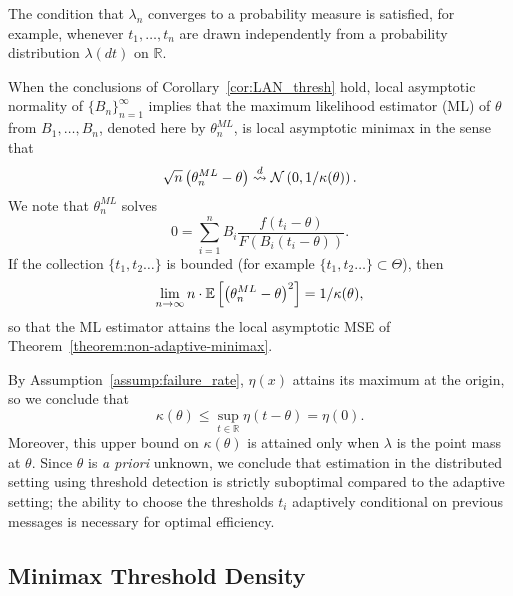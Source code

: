 The condition that $\lambda_n$ converges to a probability measure is
satisfied, for example, whenever $t_1,\ldots,t_n$ are drawn
independently from a probability distribution $\lambda(dt)$ on $\mathbb
R$.

When the conclusions of Corollary~\ref{cor:LAN_thresh} hold, local asymptotic normality of $\{B_n\}_{n=1}^\infty$ implies that the maximum
likelihood estimator (ML) of $\theta$ from $B_1,\ldots,B_n$, denoted here by
${\theta}^{ML}_n$, is local asymptotic minimax in the sense that
\begin{equation*}
  \sqrt{n} \left( {\theta}^{ML}_n - \theta \right)
  \stackrel{d}{\rightsquigarrow} \mathcal{N}\left(0, 1/\kappa(\theta) \right). 
\end{equation*}
We note that ${\theta}^{ML}_n$ solves
\begin{equation}
  \label{eq:ML}
  0 = \sum_{i=1}^n B_i \frac{f \left( t_i-\theta\right) }{F \left(B_i  (t_i-\theta)\right) }.
\end{equation}
If the collection $\{t_1,t_2\ldots\}$ is bounded
(for example $\{t_1,t_2\ldots\} \subset \Theta$), then
\begin{equation*}
\lim_{n\to \infty} n \cdot \mathbb{E}\left[ \left({\theta}^{ML}_n - \theta \right)^2\right]  = 1/\kappa(\theta), 
\end{equation*} 
so that the ML estimator attains the local asymptotic MSE of Theorem~\ref{theorem:non-adaptive-minimax}.

By Assumption~\ref{assump:failure_rate},
$\eta(x)$ attains its maximum at the origin, so we conclude that
\begin{equation*}
  \kappa(\theta) \leq \sup_{t\in \mathbb R} \eta \left( t-\theta\right) = \eta(0).
\end{equation*}
Moreover, this upper bound on $\kappa(\theta)$ is attained only when
$\lambda$ is the point mass at $\theta$. Since $\theta$ is \emph{a priori}
unknown, we conclude that estimation in the distributed setting using
threshold detection is strictly suboptimal compared to the adaptive
setting; the ability to choose the thresholds $t_i$
adaptively conditional on previous messages is necessary for optimal
efficiency.



\subsection{Minimax Threshold Density}

